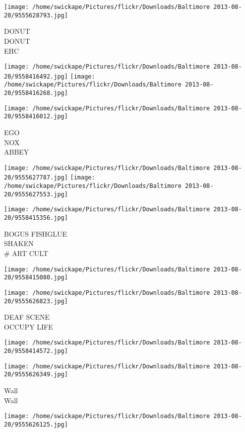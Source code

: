 \documentclass[10pt,letterpaper]{article}
\begin{document}
\vspace{0.25in}
\texttt{[image: /home/swickape/Pictures/flickr/Downloads/Baltimore 2013-08-20/9555628793.jpg]}

DONUT\\
DONUT\\
EHC
\pagebreak

\texttt{[image: /home/swickape/Pictures/flickr/Downloads/Baltimore 2013-08-20/9558416492.jpg]}
\texttt{[image: /home/swickape/Pictures/flickr/Downloads/Baltimore 2013-08-20/9558416268.jpg]}

\vspace{0.25in}
\texttt{[image: /home/swickape/Pictures/flickr/Downloads/Baltimore 2013-08-20/9558416012.jpg]}

EGO\\
NOX\\
ABBEY
\pagebreak

\texttt{[image: /home/swickape/Pictures/flickr/Downloads/Baltimore 2013-08-20/9555627787.jpg]}
\texttt{[image: /home/swickape/Pictures/flickr/Downloads/Baltimore 2013-08-20/9555627553.jpg]}

\vspace{0.25in}
\texttt{[image: /home/swickape/Pictures/flickr/Downloads/Baltimore 2013-08-20/9558415356.jpg]}

BOGUS FISHGLUE\\
SHAKEN\\
\# ART CULT
\pagebreak

\texttt{[image: /home/swickape/Pictures/flickr/Downloads/Baltimore 2013-08-20/9558415080.jpg]}

\vspace{0.25in}
\texttt{[image: /home/swickape/Pictures/flickr/Downloads/Baltimore 2013-08-20/9555626823.jpg]}

DEAF SCENE\\
OCCUPY LIFE
\pagebreak

\texttt{[image: /home/swickape/Pictures/flickr/Downloads/Baltimore 2013-08-20/9558414572.jpg]}

\vspace{0.25in}
\texttt{[image: /home/swickape/Pictures/flickr/Downloads/Baltimore 2013-08-20/9555626349.jpg]}

Wall\\
Wall
\pagebreak

\texttt{[image: /home/swickape/Pictures/flickr/Downloads/Baltimore 2013-08-20/9555626125.jpg]}
\end{document}
